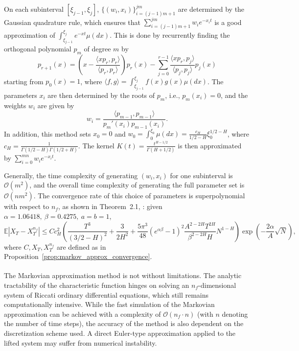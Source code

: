 \documentclass[11pt]{article}%
\theoremstyle{definition}
\begin{document}
    On each subinterval $[\xi_{j-1},\xi_j]$, $\{(w_i,x_i)\}_{i=(j-1)m+1}^{jm}$ are determined by the Gaussian quadrature rule, which ensures that \(\sum_{i=(j-1)m+1}^{jm} w_i e^{-x_i t}\) is a good approximation of $\int_{\xi_{j-1}}^{\xi_j}e^{-xt}\mu(dx)$. This is done by recurrently finding the orthogonal polynomial \(p_m\) of degree \(m\) by 
    \[
    p_{r+1}(x) = \left(x - \frac{\langle xp_r,p_r\rangle}{\langle p_r,p_r\rangle}\right)p_r(x) - \sum_{j=0}^{r-1} \frac{\langle xp_r,p_j\rangle}{\langle p_j,p_j\rangle} p_j(x)
    \]
    starting from \(p_0(x)=1\), where \(\langle f,g\rangle = \int_{\xi_{j-1}}^{\xi_j} f(x)g(x)\mu(dx)\). The parameters \(x_i\) are then determined by the roots of \(p_m\), i.e., \(p_m(x_i) = 0\), and the weights \(w_i\) are given by
    \[
    w_i = \frac{\langle p_{m-1},p_{m-1}\rangle}{p_m'(x_i) p_{m-1}(x_i)}.
    \]
    In addition, this method sets \(x_0=0\) and \(w_0=\int_0^{\xi_0} \mu(dx) = \frac{c_H}{1/2-H}\xi_0^{1/2-H}\), where \(c_H = \tfrac{1}{\Gamma(1/2-H)\Gamma(1/2+H)}\). The kernel \(K(t) = \tfrac{t^{H-1/2}}{\Gamma(H+1/2)}\) is then approximated by \(\sum_{i=0}^{mn} w_i e^{-x_i t}\).

    Generally, the time complexity of generating \((w_i,x_i)\) for one subinterval is \(\mathcal{O}(m^2)\), and the overall time complexity of generating the full parameter set is \(\mathcal{O}(nm^2)\). The convergence rate of this choice of parameters is superpolynomial with respect to \(n_f\), as shown in Theorem~2.1, \cite{Bayer_Breneis_2023}: given \(\alpha=1.06418,\ \beta=0.4275,\ a=b=1\), 
    \[
    \mathbb{E}\left|X_T - X_T^{n_f}\right| \le Cc_H^2 \left( \frac{T^3}{(3/2 - H)^2} + \frac{3}{2H^2} + \frac{5\pi^3}{48} \left(e^{\alpha \beta} - 1 \right)^2 \frac{A^{2-2H} T^{2H}}{\beta^{2-2H} H} N^{1-H} \right) \exp \left( - \frac{2\alpha}{A} \sqrt{N} \right),
    \]
    where \(C, X_T, X_T^{n_f}\) are defined as in Proposition~\ref{prop:markov_approx_convergence}.


\paragraph{}The Markovian approximation method is not without limitations. The analytic tractability of the characteristic function hinges on solving an $n_f$-dimensional system of Riccati ordinary differential equations, which still remains computationally intensive. While the fast simulation of the Markovian approximation can be achieved with a complexity of $\mathcal{O}(n_f\cdot n)$ (with $n$ denoting the number of time steps), the accuracy of the method is also dependent on the discretization scheme used. A direct Euler-type approximation applied to the lifted system may suffer from numerical instability.
\end{document}
